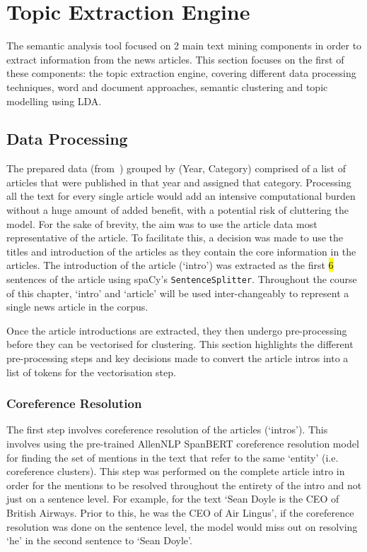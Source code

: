 \chapter{Topic Extraction Engine} \label{ch:4:topic}

The semantic analysis tool focused on 2 main text mining components in order to extract information from the news articles. This section focuses on the first of these components: the topic extraction engine, covering different data processing techniques, word and document approaches, semantic clustering and topic modelling using LDA. 

\section{Data Processing} \label{s:procesing_topic_engine}

The prepared data (from~) grouped by (Year, Category) comprised of a list of articles that were published in that year and assigned that category. Processing all the text for every single article would add an intensive computational burden without a huge amount of added benefit, with a potential risk of cluttering the model. For the sake of brevity, the aim was to use the article data most representative of the article. To facilitate this, a decision was made to use the titles and introduction of the articles as they contain the core information in the articles. The introduction of the article (`intro') was extracted as the first \hl{6} sentences of the article using spaCy's \texttt{SentenceSplitter}. Throughout the course of this chapter, `intro' and `article' will be used inter-changeably to represent a single news article in the corpus. 

Once the article introductions are extracted, they then undergo pre-processing before they can be vectorised for clustering. This section highlights the different pre-processing steps and key decisions made to convert the article intros into a list of tokens for the vectorisation step.

\subsection{Coreference Resolution} \label{coref}
The first step involves coreference resolution of the articles (`intros'). This involves using the pre-trained AllenNLP SpanBERT coreference resolution model for finding the set of mentions in the text that refer to the same `entity' (i.e. coreference clusters). This step was performed on the complete article intro in order for the mentions to be resolved throughout the entirety of the intro and not just on a sentence level. For example, for the text `Sean Doyle is the CEO of British Airways. Prior to this, he was the CEO of Air Lingus', if the coreference resolution was done on the sentence level, the model would miss out on resolving `he' in the second sentence to `Sean Doyle'.

